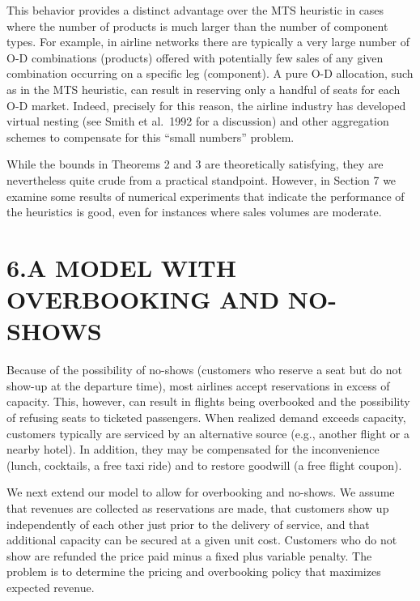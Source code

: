This behavior provides a distinct advantage over the MTS heuristic in cases where the number of products is much larger than the number of component types. For example, in airline networks there are typically a very large number of O-D combinations (products) offered with potentially few sales of any given combination occurring on a specific leg (component). A pure O-D allocation, such as in the MTS heuristic, can result in reserving only a handful of seats for each O-D market. Indeed, precisely for this reason, the airline industry has developed virtual nesting (see Smith et al.~1992 for a discussion) and other aggregation schemes to compensate for this ``small numbers'' problem.

While the bounds in Theorems 2 and 3 are theoretically satisfying, they are nevertheless quite crude from a practical standpoint. However, in Section 7 we examine some results of numerical experiments that indicate the performance of the heuristics is good, even for instances where sales volumes are moderate.


\section{6.A MODEL WITH OVERBOOKING AND NO-SHOWS}\label{a-model-with-overbooking-and-no-shows}

Because of the possibility of no-shows (customers who reserve a seat but do not show-up at the departure time), most airlines accept reservations in excess of capacity. This, however, can result in flights being overbooked and the possibility of refusing seats to ticketed passengers. When realized demand exceeds capacity, customers typically are serviced by an alternative source (e.g., another flight or a nearby hotel). In addition, they may be compensated for the inconvenience (lunch, cocktails, a free taxi ride) and to restore goodwill (a free flight coupon).

We next extend our model to allow for overbooking and no-shows. We assume that revenues are collected as reservations are made, that customers show up independently of each other just prior to the delivery of service, and that additional capacity can be secured at a given unit cost. Customers who do not show are refunded the price paid minus a fixed plus variable penalty. The problem is to determine the pricing and overbooking policy that maximizes expected revenue.

